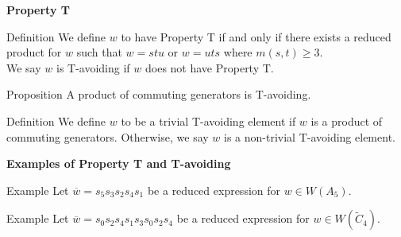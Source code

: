 \documentclass{beamer}
\newcommand{\w}{\overline{w}}
\newcommand{\C}{\widetilde{C}}
\newcommand\heapblock[4]{\fill[fill=#4, fill opacity=0.35, draw=#4, line width=1.1pt, rounded corners,shift={(\xxaxis:#1)},shift={(\yyaxis:#2)}] (-1,-1) rectangle (1,1);\node at (#1,#2) {\footnotesize $#3$};}
\newcommand\xxaxis{0}
\newcommand\yyaxis{90}
\begin{document}
\begin{frame}{\textbf{Property T}}
	\begin{block}{Definition}
	We define $w$ to have \alert{Property T} if and only if there exists a reduced product for $w$ such that $w=stu$ or $w=uts$ where $m(s,t) \geq 3$.\\ \pause 
	\vspace{1em}
	We say $w$ is \alert{T-avoiding} if $w$ does not have Property T.
	\end{block}
\pause
\begin{block}{Proposition}
A product of commuting generators is T-avoiding.	
\end{block}
\pause
\begin{block}{Definition}
	We define $w$ to be a \alert{trivial T-avoiding} element if $w$ is a product of commuting generators. Otherwise, we say $w$ is a \alert{non-trivial T-avoiding} element.
\end{block}

\end{frame}




\begin{frame}{\textbf{Examples of Property T and T-avoiding}}

\begin{block}{Example}
Let $\w=s_5s_3s_2s_4s_1$ be a reduced expression for $w \in W(A_5)$. 
\pause
\begin{figure}
\end{figure}
\end{block}

\pause

\begin{block}{Example}
Let $\w=s_0s_2s_4s_1s_3s_0s_2s_4$ be a reduced expression for $w \in W(\C_4)$.
\begin{figure}
\end{figure}
\end{block}

\end{frame}
\end{document}
